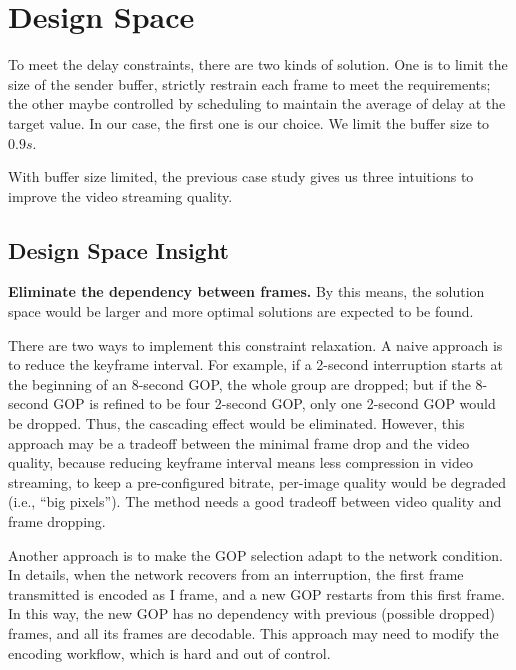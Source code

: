 \section{Design Space}
To meet the delay constraints, there are two kinds of solution. One is to limit the size of the sender buffer, strictly restrain each frame to meet the requirements; the other maybe controlled by scheduling to maintain the average of delay at the target value. In our case, the first one is our choice. We limit the buffer size to $0.9s$. 

With buffer size limited, the previous case study gives us three intuitions to improve the video streaming quality.
\subsection{Design Space Insight}
\textbf{Eliminate the dependency between frames.}
By this means, the solution space would be larger and more optimal solutions are expected to be found.

There are two ways to implement this constraint relaxation. A naive approach is to reduce the keyframe interval. For example, if a 2-second interruption starts at the beginning of an 8-second GOP, the whole group are dropped; but if the 8-second GOP is refined to be four 2-second GOP, only one 2-second GOP would be dropped. Thus, the cascading effect would be eliminated. However, this approach may be a tradeoff between the minimal frame drop and the video quality, because reducing keyframe interval means less compression in video streaming, to keep a pre-configured bitrate, per-image quality would be degraded (i.e., ``big pixels''). The method needs a good tradeoff between video quality and frame dropping.

Another approach is to make the GOP selection adapt to the network condition. In details, when the network recovers from an interruption, the first frame transmitted is encoded as I frame, and a new GOP restarts from this first frame. In this way, the new GOP has no dependency with previous (possible dropped) frames, and all its frames are decodable. This approach may need to modify the encoding workflow, which is hard and out of control.


